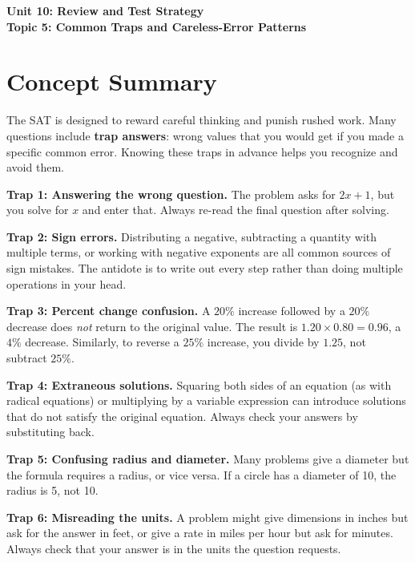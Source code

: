 \documentclass[14pt]{extarticle}
\begin{document}
\raggedright
{}

\begin{center}
    \LARGE \textbf{Unit 10: Review and Test Strategy} \\[6pt]
    \Large \textbf{Topic 5: Common Traps and Careless-Error Patterns}
\end{center}

\vspace{1em}

\section*{Concept Summary}

The SAT is designed to reward careful thinking and punish rushed work. Many questions include \textbf{trap answers}: wrong values that you would get if you made a specific common error. Knowing these traps in advance helps you recognize and avoid them.

\textbf{Trap 1: Answering the wrong question.} The problem asks for \(2x + 1\), but you solve for \(x\) and enter that. Always re-read the final question after solving.

\textbf{Trap 2: Sign errors.} Distributing a negative, subtracting a quantity with multiple terms, or working with negative exponents are all common sources of sign mistakes. The antidote is to write out every step rather than doing multiple operations in your head.

\textbf{Trap 3: Percent change confusion.} A \(20\%\) increase followed by a \(20\%\) decrease does \textit{not} return to the original value. The result is \(1.20 \times 0.80 = 0.96\), a \(4\%\) decrease. Similarly, to reverse a \(25\%\) increase, you divide by \(1.25\), not subtract \(25\%\).

\textbf{Trap 4: Extraneous solutions.} Squaring both sides of an equation (as with radical equations) or multiplying by a variable expression can introduce solutions that do not satisfy the original equation. Always check your answers by substituting back.

\textbf{Trap 5: Confusing radius and diameter.} Many problems give a diameter but the formula requires a radius, or vice versa. If a circle has a diameter of 10, the radius is 5, not 10.

\textbf{Trap 6: Misreading the units.} A problem might give dimensions in inches but ask for the answer in feet, or give a rate in miles per hour but ask for minutes. Always check that your answer is in the units the question requests.
\end{document}
